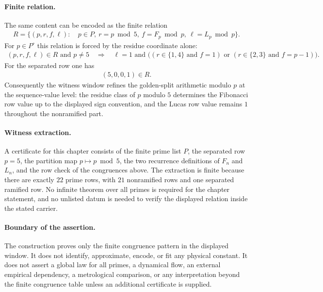 \paragraph{Finite relation.}
The same content can be encoded as the finite relation
$$
\begin{aligned}
R=\{(p,r,f,\ell):\ &p\in P,\ r=p\bmod 5,\ f=F_p\bmod p,\ \ell=L_p\bmod p\}.
\end{aligned}
$$
For $p\in P^{\circ}$ this relation is forced by the residue coordinate alone:
$$
\begin{aligned}
(p,r,f,\ell)\in R\text{ and }p\ne 5
\quad\Longrightarrow\quad
\ell=1\text{ and }
\bigl((r\in\{1,4\}\text{ and }f=1)\text{ or }(r\in\{2,3\}\text{ and }f=p-1)\bigr).
\end{aligned}
$$
For the separated row one has
$$
\begin{aligned}
(5,0,0,1)\in R.
\end{aligned}
$$
Consequently the witness window refines the golden-split arithmetic modulo $p$ at the sequence-value level: the residue class of $p$ modulo $5$ determines the Fibonacci row value up to the displayed sign convention, and the Lucas row value remains $1$ throughout the nonramified part.

\paragraph{Witness extraction.}
A certificate for this chapter consists of the finite prime list $P$, the separated row $p=5$, the partition map $p\mapsto p\bmod 5$, the two recurrence definitions of $F_n$ and $L_n$, and the row check of the congruences above. The extraction is finite because there are exactly $22$ prime rows, with $21$ nonramified rows and one separated ramified row. No infinite theorem over all primes is required for the chapter statement, and no unlisted datum is needed to verify the displayed relation inside the stated carrier.

\paragraph{Boundary of the assertion.}
The construction proves only the finite congruence pattern in the displayed window. It does not identify, approximate, encode, or fit any physical constant. It does not assert a global law for all primes, a dynamical flow, an external empirical dependency, a metrological comparison, or any interpretation beyond the finite congruence table unless an additional certificate is supplied.
